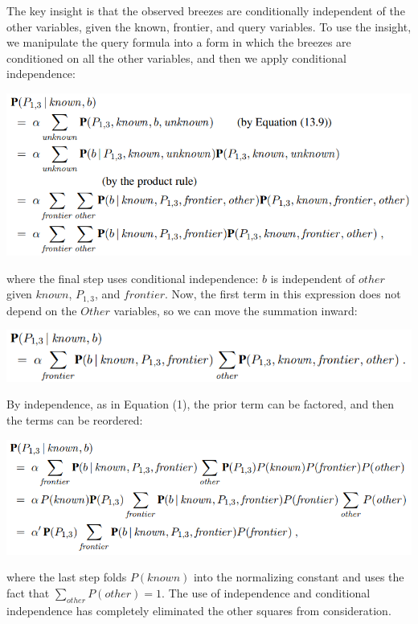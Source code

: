 The key insight is that the observed breezes are conditionally independent of the other variables, given the known, frontier, and query variables. To use the insight, we manipulate the query formula into a form in which the breezes
are conditioned on all the other variables, and then we apply conditional independence:
\begin{center}
    \includegraphics[]{images/wumpus-probs3.png}
\end{center}
where the final step uses conditional independence: $b$ is independent of $other$ given $known$, $P_{1,3}$, and $frontier$. Now, the first term in this expression does not depend on the $Other$ variables, so we can move the summation inward:
\begin{center}
    \includegraphics[]{images/wumpus-probs4.png}
\end{center}
By independence, as in Equation (1), the prior term can be factored, and then the terms can be reordered:
\begin{center}
    \includegraphics[]{images/wumpus-probs5.png}
\end{center}
where the last step folds $P(known)$ into the normalizing constant and uses the fact that $\sum_{other}P(other) = 1$. The use of independence and conditional independence has completely eliminated the other squares from consideration.\\\\
